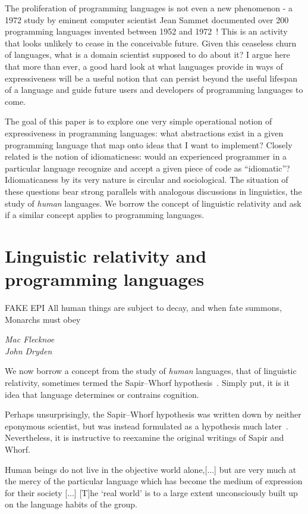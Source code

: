 \documentclass[11pt]{asaproc}
\begin{document}
The proliferation of programming
languages is not even a new phenomenon - a 1972 study by eminent computer
scientist Jean Sammet documented over 200 programming languages invented between
1952 and 1972~\cite{Sammet1972}!
This is an activity that looks unlikely to cease in the conceivable future.
Given this ceaseless churn of languages, what is a domain scientist supposed to
do about it? I argue here that more than ever, a good hard look at what languages
provide in ways of expressiveness will be a useful notion that can persist beyond
the useful lifespan of a language and guide future users and developers of programming
languages to come.

The goal of this paper is to explore one very simple operational notion of expressiveness
in programming languages: what abstractions exist in a given programming language
that map onto ideas that I want to implement? Closely related is the notion of
idiomaticness: would an experienced programmer in a particular language recognize
and accept a given piece of code as ``idiomatic''?
Idiomaticaness by its very nature is circular and sociological.
The situation of these questions bear strong parallels with analogous discussions
in linguistics, the study of \textit{human} languages.
We borrow the concept of linguistic relativity and ask if a similar concept
applies to programming languages.


\section{Linguistic relativity and programming languages}

\epigraph{FAKE EPI All human things are subject to decay, and when fate
summons, Monarchs must obey}{\textit{Mac Flecknoe \\ John Dryden}}


We now borrow a concept from the study of \textit{human} languages, that
of linguistic relativity, sometimes termed the Sapir--Whorf hypothesis~\cite{Brown1976}.
Simply put, it is it idea that language determines or contrains cognition.

Perhaps unsurprisingly, the Sapir--Whorf hypothesis was written down by neither
eponymous scientist, but was instead formulated as a hypothesis much
later~\cite{Brown1976}. Nevertheless, it is instructive to reexamine the original
writings of Sapir and Whorf.


Human beings do not live in the objective world alone,[...] but are very much at
the mercy of the particular language which has become the medium of expression
for their society [...] [T]he `real world' is to a large extent unconsciously
built up on the language habits of the group.~\cite{Sapir1929}
\end{document}
